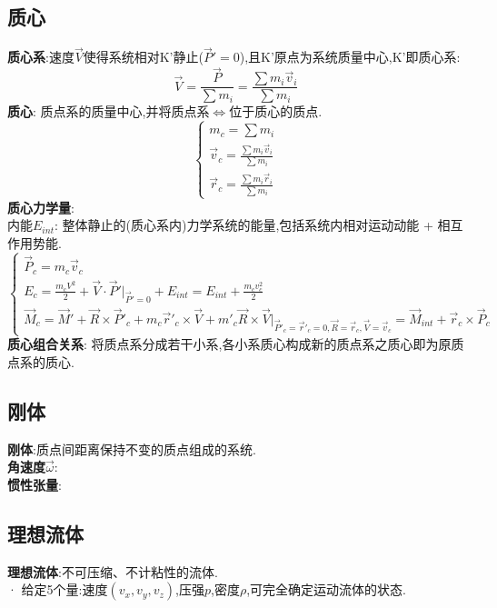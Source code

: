 \documentclass{article}
\begin{document}
\subsection{质心}
\textbf{质心系}:\exists 速度$\vec V$使得系统相对K'静止($\vec P' = 0$),且K'原点为系统质量中心,K'即质心系:
$$\vec V = \frac{\vec P}{\sum m_i} = \frac{\sum m_i \vec v_i}{\sum m_i}$$
\textbf{质心}: 质点系的质量中心,并将质点系$\Leftrightarrow$位于质心的质点.
\begin{displaymath}
    \left\{ \begin{array}{ll}
    m_c = \sum m_i\\
    \vec v_c = \frac{\sum m_i \vec v_i}{\sum m_i}\\
    \vec r_c = \frac{\sum m_i \vec r_i}{\sum m_i}
    \end{array} \right.
\end{displaymath}
\textbf{质心力学量}:\\
内能$E_{int}$: 整体静止的(质心系内)力学系统的能量,包括系统内相对运动动能 + 相互作用势能.\\
\begin{displaymath}
    \left\{ \begin{array}{ll}
    \vec P_c = m_c \vec v_c\\
    E_c = \frac{m_c V^2}{2} + \vec V \cdot \vec P' |_{\vec P'=0} + E_{int} = E_{int} + \frac{m_c v_c^2}{2}\\
    \vec M_c = \vec M' + \vec R \times \vec P'_c + m_c \vec r'_c \times \vec V + m'_c \vec R \times \vec V|_{\vec P'_c =\vec r'_c = 0, \vec R =\vec r_c, \vec V =\vec v_c} = \vec M_{int} + \vec r_c \times \vec P_c 
    \end{array} \right.
\end{displaymath}
\textbf{质心组合关系}: 将质点系分成若干小系,各小系质心构成新的质点系之质心即为原质点系的质心.


\subsection{刚体}
\textbf{刚体}:质点间距离保持不变的质点组成的系统.\\
\textbf{角速度$\vec \omega$}:\\
\textbf{惯性张量}:



\subsection{理想流体}
\textbf{理想流体}:不可压缩、不计粘性的流体.\\
· 给定5个量:速度$(v_x,v_y,v_z)$,压强$p$,密度$\rho$,可完全确定运动流体的状态.
\end{document}
